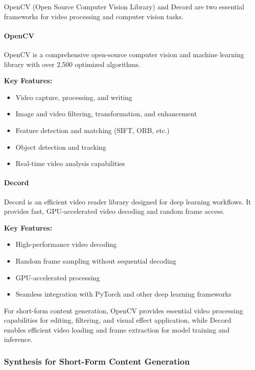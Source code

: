 \documentclass[12pt,a4paper,oneside,english]{book}
\begin{document}
OpenCV (Open Source Computer Vision Library) and Decord are two essential frameworks for video processing and computer vision tasks.

\paragraph{OpenCV}
OpenCV is a comprehensive open-source computer vision and machine learning library with over 2,500 optimized algorithms.

\textbf{Key Features:}
\begin{itemize}
    \item Video capture, processing, and writing
    \item Image and video filtering, transformation, and enhancement
    \item Feature detection and matching (SIFT, ORB, etc.)
    \item Object detection and tracking
    \item Real-time video analysis capabilities
\end{itemize}

\paragraph{Decord}
Decord is an efficient video reader library designed for deep learning workflows. It provides fast, GPU-accelerated video decoding and random frame access.

\textbf{Key Features:}
\begin{itemize}
    \item High-performance video decoding
    \item Random frame sampling without sequential decoding
    \item GPU-accelerated processing
    \item Seamless integration with PyTorch and other deep learning frameworks
\end{itemize}

For short-form content generation, OpenCV provides essential video processing capabilities for editing, filtering, and visual effect application, while Decord enables efficient video loading and frame extraction for model training and inference.

\subsubsection{Synthesis for Short-Form Content Generation}
\label{subsubsec:unimodal_synthesis}
\end{document}
